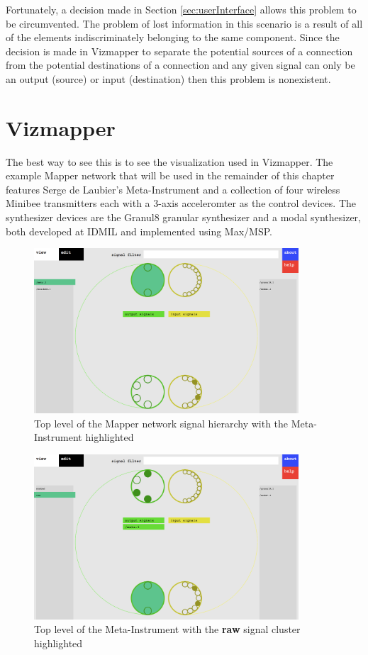 Fortunately, a decision made in Section \ref{sec:userInterface} allows this problem to be circumvented. The problem of lost information in this scenario is a result of all of the elements indiscriminately belonging to the same component. Since the decision is made in Vizmapper to separate the potential sources of a connection from the potential destinations of a connection and any given signal can only be an output (source) or input (destination) then this problem is nonexistent.

\section{Vizmapper}

The best way to see this is to see the visualization used in Vizmapper. The example Mapper network that will be used in the remainder of this chapter features Serge de Laubier's Meta-Instrument \cite{metainstrument1998} and a collection of four wireless Minibee transmitters each with a 3-axis acceleromter as the control devices. The synthesizer devices are the Granul8 granular synthesizer and a modal synthesizer, both developed at IDMIL and implemented using Max/MSP. 

\begin{figure}[p]
\centering
\includegraphics[width=0.88\textwidth]{vizmapperFirst.png}
\caption{Top level of the Mapper network signal hierarchy with the Meta-Instrument highlighted}
\label{fig:vizOne}
\end{figure}

\begin{figure}[p]
\centering
\includegraphics[width=0.88\textwidth]{vizmapperSecond.png}
\caption{Top level of the Meta-Instrument with the \textbf{raw} signal cluster highlighted}
\label{fig:vizTwo}
\end{figure}

